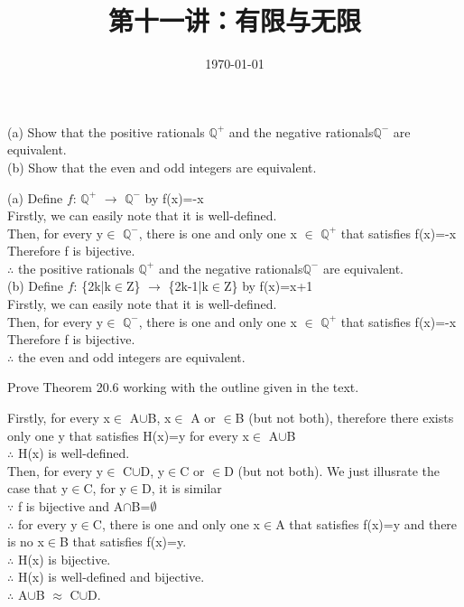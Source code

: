 \documentclass[11pt, a4paper, UTF8]{ctexart}
\title{第十一讲：有限与无限}
\date{\today}     %
\begin{document}
\maketitle
\noplagiarism	%
\beginthishw	%

\begin{problem}[UD:20.4]
(a) Show that the positive rationals $\mathbb{Q}^+$ and the negative rationals$\mathbb{Q}^-$ are equivalent.\\
(b) Show that the even and odd integers are equivalent.
\end{problem}
\begin{solution}
(a) Define $f$: $\mathbb{Q}^+$ $\rightarrow$ $\mathbb{Q}^-$ by f(x)=-x\\
Firstly, we can easily note that it is well-defined.\\
Then, for every y$\in$ $\mathbb{Q}^-$, there is one and only one x $\in$ $\mathbb{Q}^+$ that satisfies f(x)=-x\\
Therefore f is bijective.\\
$\therefore$  the positive rationals $\mathbb{Q}^+$ and the negative rationals$\mathbb{Q}^-$ are equivalent.\\
(b) Define $f$: \{2k|k$\in$Z\} $\rightarrow$ \{2k-1|k$\in$Z\} by f(x)=x+1\\
Firstly, we can easily note that it is well-defined.\\
Then, for every y$\in$ $\mathbb{Q}^-$, there is one and only one x $\in$ $\mathbb{Q}^+$ that satisfies f(x)=-x\\
Therefore f is bijective.\\
$\therefore$ the even and odd integers are equivalent.
\end{solution}

\begin{problem}[UD:20.8]
Prove Theorem 20.6 working with the outline given in the text.
\end{problem}
\begin{solution}
Firstly, for every x$\in$ A$\cup$B, x$\in$ A or $\in$B (but not both), therefore there exists only one y that satisfies H(x)=y for every x$\in$ A$\cup$B\\
$\therefore$ H(x) is well-defined.\\
Then, for every y$\in$ C$\cup$D, y$\in$C or $\in$D (but not both). We just illusrate the case that y$\in$C, for y$\in$D, it is similar\\
$\because$ f is bijective and A$\cap$B=$\emptyset$\\
$\therefore$ for every y$\in$C, there is one and only one x$\in$A that satisfies f(x)=y and there is no x$\in$B that satisfies f(x)=y.\\
$\therefore$ H(x) is bijective.\\
$\therefore$ H(x) is well-defined and bijective.\\
$\therefore$ A$\cup$B $\approx$ C$\cup$D.
 \end{solution}
\end{document}
